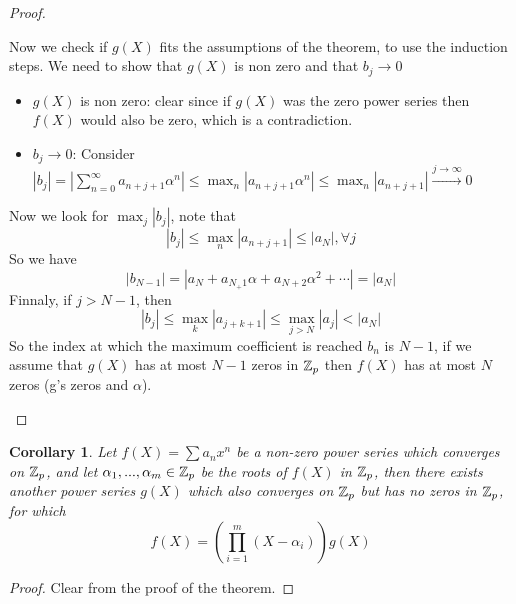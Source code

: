 \documentclass[a4paper]{article}
\theoremstyle{plain}
\newtheorem{Cor}[thm]{Corollary}
\theoremstyle{definition}
\begin{document}
\begin{proof}
\begin{itemize}
          Now we check if $g(X)$ fits the assumptions of the theorem, to use the induction steps. We need to show that $g(X)$ is non zero and that $b_{j} \to 0$
          \begin{itemize}
            \item $g(X)$ is non zero: clear since if $g(X)$ was the zero power series then $f(X)$ would also be zero, which is a contradiction.
            \item $b_{j} \to 0$: Consider $|b_{j}| = \left|\sum_{n=0}^{\infty}a_{n+j+1}\alpha^{n}\right| \leq \max_{n}|a_{n+j+1}\alpha^{n}| \leq \max_{n}|a_{n+j+1}| \xrightarrow{j \to \infty} 0$
          \end{itemize}
          Now we look for $\max_{j}|b_{j}|$, note that
          $$|b_{j}| \leq \max_{n}|a_{n+j+1}| \leq |a_{N}|, \forall j$$
          So we have
          $$|b_{N-1}| = |a_{N} + a_{N_+1}\alpha + a_{N+2}\alpha^{2} + \cdots | = |a_{N}|$$
          Finnaly, if $j > N-1$, then
          $$|b_{j}| \leq \max_{k}|a_{j+k+1}| \leq \max_{j > N}|a_{j}| < |a_{N}|$$
      So the index at which the maximum coefficient is reached $b_{n}$ is $N-1$, if we assume that $g(X)$ has at most $N-1$ zeros in $\Bbb Z_{p}$ then $f(X)$ has at most $N$ zeros (g's zeros and $\alpha$).
  \end{itemize}
\end{proof}
\begin{Cor} %
  Let $f(X) = \sum a_{n}x^{n}$ be a non-zero power series which converges on $\Bbb Z_{p}$, and let $\alpha_{1}, ..., \alpha_{m} \in \Bbb Z_{p}$ be the roots of $f(X)$ in $\Bbb Z_{p}$, then there exists another power series $g(X)$ which also converges on $\Bbb Z_{p}$ but has no zeros in $\Bbb Z_{p}$, for which
  $$f(X) = \left(\prod_{i=1}^{m}(X-\alpha_{i})\right)g(X)$$
\end{Cor}
\begin{proof}
  Clear from the proof of the theorem.
\end{proof}
\end{document}
